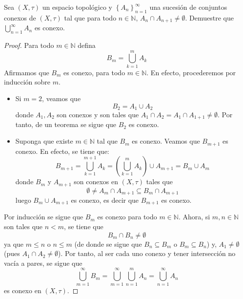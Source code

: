 \documentclass[12pt]{report}
\theoremstyle{largebreak}
\begin{document}
    \begin{excer}
        Sea $(X,\tau)$ un espacio topológico y $\left\{A_n\right\}_{ n=1}^\infty$ una sucesión de conjuntos conexos de $(X,\tau)$ tal que para todo $n\in\mathbb{N}$, $A_n\cap A_{ n+1}\neq\emptyset$. Demuestre que $\bigcup_{ n=1}^\infty A_n$ es conexo.
    \end{excer}

    \begin{proof}
        Para todo $m\in\mathbb{N}$ defina
        \begin{equation*}
            B_m=\bigcup_{ k=1}^m A_k
        \end{equation*}
        Afirmamos que $B_m$ es conexo, para todo $m\in\mathbb{N}$. En efecto, procederemos por inducción sobre $m$.
        \begin{itemize}
            \item Si $m=2$, veamos que
            \begin{equation*}
                B_2=A_1\cup A_2
            \end{equation*}
            donde $A_1,A_2$ son conexos y son tales que $A_1\cap A_2=A_1\cap A_{ 1+1}\neq\emptyset$. Por tanto, de un teorema se sigue que $B_2$ es conexo.
            \item Suponga que existe $m\in\mathbb{N}$ tal que $B_m$ es conexo. Veamos que $B_{ m+1}$ es conexo. En efecto, se tiene que:
            \begin{equation*}
                B_{ m+1}=\bigcup_{ k=1}^{ m+1}A_k=\left(\bigcup_{ k=1}^{ m}A_k\right)\cup A_{ m+1}=B_m\cup A_m
            \end{equation*}
            donde $B_m$ y $A_{ m+1}$ son conexos en $(X,\tau)$ tales que
            \begin{equation*}
                \emptyset\neq A_m\cap A_{ m+1}\subseteq B_m\cap A_{ m+1}
            \end{equation*}
            luego $B_m\cup A_{ m+1}$ es conexo, es decir que $B_{ m+1}$ es conexo.
        \end{itemize}
        Por inducción se sigue que $B_m$ es conexo para todo $m\in\mathbb{N}$. Ahora, si $m,n\in\mathbb{N}$ son tales que $n<m$, se tiene que
        \begin{equation*}
            B_m\cap B_n\neq\emptyset
        \end{equation*}
        ya que $m\leq n$ o $n\leq m$ (de donde se sigue que $B_n\subseteq B_m$ o $B_m\subseteq B_n$) y, $A_1\neq\emptyset$ (pues $A_1\cap A_2\neq\emptyset$). Por tanto, al ser cada uno conexo y tener intersección no vacía a pares, se sigue que
        \begin{equation*}
            \bigcup_{ m=1}^{\infty}B_m=\bigcup_{ m=1}^{\infty}\bigcup_{ n=1}^{m}A_n=\bigcup_{ n=1}^{\infty}A_n
        \end{equation*}
        es conexo en $(X,\tau)$.
    \end{proof}
\end{document}
